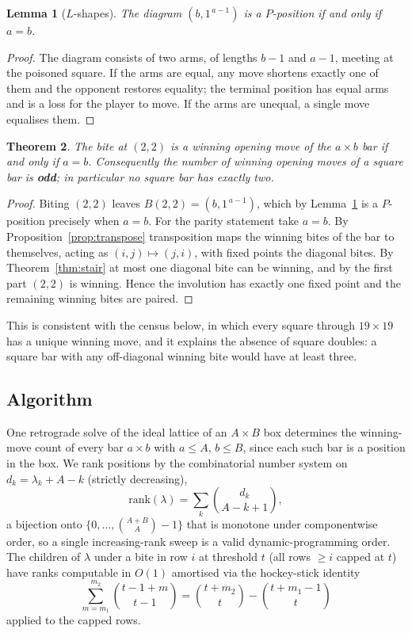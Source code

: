 \documentclass[11pt]{article}
\newtheorem{theorem}{Theorem}[section]
\newtheorem{lemma}[theorem]{Lemma}
\theoremstyle{definition}
\begin{document}
\begin{lemma}[$L$-shapes]\label{lem:L}
The diagram $(b,1^{\,a-1})$ is a $P$-position if and only if $a=b$.
\end{lemma}

\begin{proof}
The diagram consists of two arms, of lengths $b-1$ and $a-1$, meeting at the
poisoned square. If the arms are equal, any move shortens exactly one of them
and the opponent restores equality; the terminal position has equal arms and is
a loss for the player to move. If the arms are unequal, a single move equalises
them.
\end{proof}

\begin{theorem}\label{thm:square}
The bite at $(2,2)$ is a winning opening move of the $a\times b$ bar if and
only if $a=b$. Consequently the number of winning opening moves of a square bar
is \textbf{odd}; in particular no square bar has exactly two.
\end{theorem}

\begin{proof}
Biting $(2,2)$ leaves $B(2,2)=(b,1^{\,a-1})$, which by Lemma~\ref{lem:L} is a
$P$-position precisely when $a=b$. For the parity statement take $a=b$. By
Proposition~\ref{prop:transpose} transposition maps the winning bites of the
bar to themselves, acting as $(i,j)\mapsto(j,i)$, with fixed points the
diagonal bites. By Theorem~\ref{thm:stair} at most one diagonal bite can be
winning, and by the first part $(2,2)$ is winning. Hence the involution has
exactly one fixed point and the remaining winning bites are paired.
\end{proof}

This is consistent with the census below, in which every square through
$19\times19$ has a unique winning move, and it explains the absence of square
doubles: a square bar with any off-diagonal winning bite would have at least
three.

\subsection{Algorithm}

One retrograde solve of the ideal lattice of an $A\times B$ box determines the
winning-move count of every bar $a\times b$ with $a\le A$, $b\le B$, since each
such bar is a position in the box. We rank positions by the combinatorial
number system on $d_k=\lambda_k+A-k$ (strictly decreasing),
\[
  \mathrm{rank}(\lambda)=\sum_k\binom{d_k}{A-k+1},
\]
a bijection onto $\{0,\dots,\binom{A+B}{A}-1\}$ that is monotone under
componentwise order, so a single increasing-rank sweep is a valid
dynamic-programming order. The children of $\lambda$ under a bite in row $i$ at
threshold $t$ (all rows $\ge i$ capped at $t$) have ranks computable in $O(1)$
amortised via the hockey-stick identity
\[
  \sum_{m=m_1}^{m_2}\binom{t-1+m}{t-1}=\binom{t+m_2}{t}-\binom{t+m_1-1}{t}
\]
applied to the capped rows.
\end{document}
